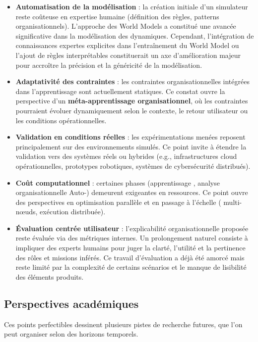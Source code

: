 \begin{itemize}
  \item \textbf{Automatisation de la modélisation} : la création initiale d’un simulateur reste coûteuse en expertise humaine (définition des règles, patterns organisationnels). L’approche des World Models a constitué une avancée significative dans la modélisation des dynamiques. Cependant, l’intégration de connaissances expertes explicites dans l’entraînement du World Model ou l’ajout de règles interprétables constituerait un axe d’amélioration majeur pour accroître la précision et la généricité de la modélisation.
  \item \textbf{Adaptativité des contraintes} : les contraintes organisationnelles intégrées dans l’apprentissage sont actuellement statiques. Ce constat ouvre la perspective d’un \textbf{méta-apprentissage organisationnel}, où les contraintes pourraient évoluer dynamiquement selon le contexte, le retour utilisateur ou les conditions opérationnelles.
  \item \textbf{Validation en conditions réelles} : les expérimentations menées reposent principalement sur des environnements simulés. Ce point invite à étendre la validation vers des systèmes réels ou hybrides (e.g., infrastructures cloud opérationnelles, prototypes robotiques, systèmes de cybersécurité distribués).
  \item \textbf{Coût computationnel} : certaines phases (apprentissage , analyse organisationnelle Auto-) demeurent exigeantes en ressources. Ce point ouvre des perspectives en optimisation parallèle et en passage à l’échelle ( multi-nœuds, exécution distribuée).
  \item \textbf{Évaluation centrée utilisateur} : l’explicabilité organisationnelle proposée reste évaluée via des métriques internes. Un prolongement naturel consiste à impliquer des experts humains pour juger la clarté, l’utilité et la pertinence des rôles et missions inférés. Ce travail d’évaluation a déjà été amorcé mais reste limité par la complexité de certains scénarios et le manque de lisibilité des éléments produits.
\end{itemize}

\subsection*{Perspectives académiques}

Ces points perfectibles dessinent plusieurs pistes de recherche futures, que l’on peut organiser selon des horizons temporels.

